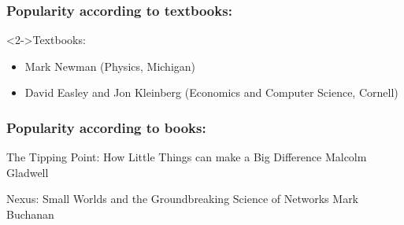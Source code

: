 
\begin{frame}
  \frametitle{Popularity according to textbooks:}
  
  \begin{block}<2->{Textbooks:}
    \begin{itemize}
      \item \small
        Mark Newman (Physics, Michigan)\\
      \item \small
        David Easley and Jon Kleinberg (Economics and Computer Science, Cornell)\\
    \end{itemize}
  \end{block}

\end{frame}


\begin{frame}
  \frametitle{Popularity according to books:}

  {The Tipping Point: How Little Things can make a Big Difference}
  {Malcolm Gladwell\cite{gladwell2000a}}

  \bigskip

  {Nexus: Small Worlds and the Groundbreaking Science of Networks}
  {Mark Buchanan}

\end{frame}

